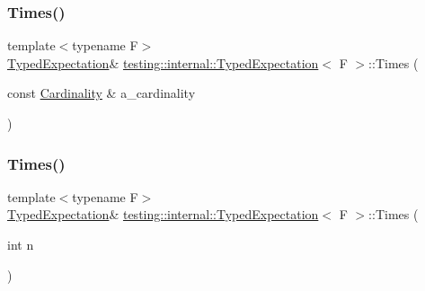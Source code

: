\mbox{\label{classtesting_1_1internal_1_1_typed_expectation_a9a4c34ee5c6e6adc880a22f61f33da57}} 
\subsubsection{\texorpdfstring{Times()}{Times()}\hspace{0.1cm}{\footnotesize\ttfamily [1/2]}}
{\footnotesize\ttfamily template$<$typename F$>$ \\
\hyperlink{classtesting_1_1internal_1_1_typed_expectation}{Typed\+Expectation}\& \hyperlink{classtesting_1_1internal_1_1_typed_expectation}{testing\+::internal\+::\+Typed\+Expectation}$<$ F $>$\+::Times (\begin{DoxyParamCaption}\item[{const \hyperlink{classtesting_1_1_cardinality}{Cardinality} \&}]{a\+\_\+cardinality }\end{DoxyParamCaption})\hspace{0.3cm}{\ttfamily [inline]}}

\mbox{\label{classtesting_1_1internal_1_1_typed_expectation_a92d56ee785d38ec8193aed2a0fcbccf0}} 
\subsubsection{\texorpdfstring{Times()}{Times()}\hspace{0.1cm}{\footnotesize\ttfamily [2/2]}}
{\footnotesize\ttfamily template$<$typename F$>$ \\
\hyperlink{classtesting_1_1internal_1_1_typed_expectation}{Typed\+Expectation}\& \hyperlink{classtesting_1_1internal_1_1_typed_expectation}{testing\+::internal\+::\+Typed\+Expectation}$<$ F $>$\+::Times (\begin{DoxyParamCaption}\item[{int}]{n }\end{DoxyParamCaption})\hspace{0.3cm}{\ttfamily [inline]}}

